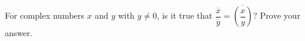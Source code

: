 For complex numbers $x$ and $y$ with $y\ne0$, is it true that $\dfrac{\overline{x}}{\overline{y}}=\overline{\left(\dfrac{x}{y}\right)}$? Prove your answer.
